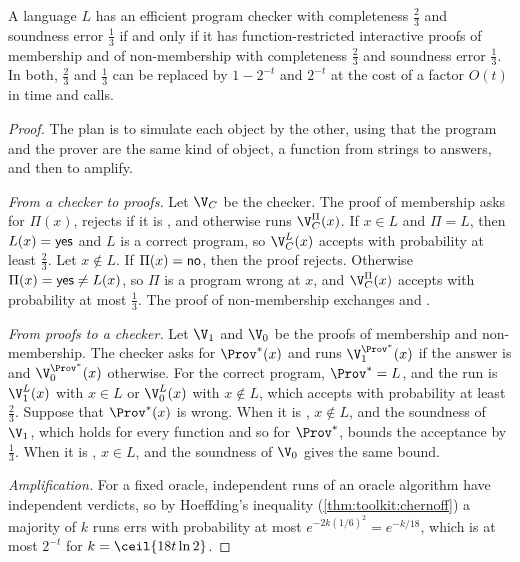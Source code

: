 \begin{refsection}
\begin{theorem}\label{thm:consistency:blumkannan}
A language $L$ has an efficient program checker with completeness $\frac23$ and soundness error $\frac13$ if and only if it has function-restricted interactive proofs of membership and of non-membership with completeness $\frac23$ and soundness error $\frac13$. In both, $\frac23$ and $\frac13$ can be replaced by $1-2^{-t}$ and $2^{-t}$ at the cost of a factor $O(t)$ in time and calls.
\end{theorem}

\begin{proof}
The plan is to simulate each object by the other, using that the program and the prover are the same kind of object, a function from strings to answers, and then to amplify.

\emph{From a checker to proofs.} Let $\V_C$ be the checker. The proof of membership asks for $\Pi(x)$, rejects if it is \consistencyno, and otherwise runs $\V_C^\Pi(x)$. If $x\in L$ and $\Pi=L$, then $L(x)=\textsf{yes}$ and $L$ is a correct program, so $\V_C^L(x)$ accepts with probability at least $\frac23$. Let $x\notin L$. If $\Pi(x)=\textsf{no}$, then the proof rejects. Otherwise $\Pi(x)=\textsf{yes}\ne L(x)$, so $\Pi$ is a program wrong at $x$, and $\V_C^\Pi(x)$ accepts with probability at most $\frac13$. The proof of non-membership exchanges \consistencyyes{} and \consistencyno.

\emph{From proofs to a checker.} Let $\V_1$ and $\V_0$ be the proofs of membership and non-membership. The checker asks for $\Prov^*(x)$ and runs $\V_1^{\Prov^*}(x)$ if the answer is \consistencyyes{} and $\V_0^{\Prov^*}(x)$ otherwise. For the correct program, $\Prov^*=L$, and the run is $\V_1^L(x)$ with $x\in L$ or $\V_0^L(x)$ with $x\notin L$, which accepts with probability at least $\frac23$. Suppose that $\Prov^*(x)$ is wrong. When it is \consistencyyes, $x\notin L$, and the soundness of $\V_1$, which holds for every function and so for $\Prov^*$, bounds the acceptance by $\frac13$. When it is \consistencyno, $x\in L$, and the soundness of $\V_0$ gives the same bound.

\emph{Amplification.} For a fixed oracle, independent runs of an oracle algorithm have independent verdicts, so by Hoeffding's inequality (\cref{thm:toolkit:chernoff}) a majority of $k$ runs errs with probability at most $e^{-2k(1/6)^2}=e^{-k/18}$, which is at most $2^{-t}$ for $k=\ceil{18t\ln2}$.
\end{proof}


\end{refsection}
